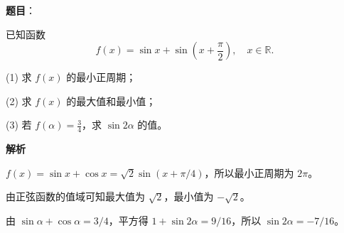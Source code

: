 \begin{answer}

\textbf{题目}：

已知函数
\nopagebreak[4]
\[
f(x)=\sin x+\sin\left(x+\frac{\pi}{2}\right),\quad x\in\mathbb R.
\]

(1) 求 \(f(x)\) 的最小正周期；

(2) 求 \(f(x)\) 的最大值和最小值；

(3) 若 \(f(\alpha)=\frac34\)，求 \(\sin 2\alpha\) 的值。

\textbf{解析}


$f(x)=\sin x+\cos x=\sqrt2\sin(x+\pi/4)$，所以最小正周期为 $2\pi$。


由正弦函数的值域可知最大值为 $\sqrt2$，最小值为 $-\sqrt2$。


由 $\sin\alpha+\cos\alpha=3/4$，平方得 $1+\sin2\alpha=9/16$，所以 $\sin2\alpha=-7/16$。




\end{answer}
